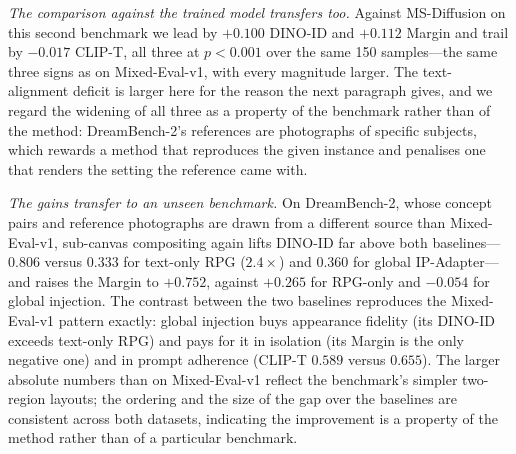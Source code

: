 \documentclass[review,10pt,times]{elsarticle}
\begin{document}
\begin{table}[htbp]
\centering
\caption{%
  \textbf{DreamBench-2 results} (150 two-concept samples from
  DreamBench++~\cite{peng2025dreambench}, $1024\times1024$).
  Ours is evaluated here at $\tau{=}1$, which is the weaker setting on
  every identity axis (Table~\ref{tab:tau}), so these numbers understate
  the method relative to its default $\tau{=}0.7$.%
}
\label{tab:dreambench2}
\end{table}

\noindent\textit{The comparison against the trained model transfers too.}
Against MS-Diffusion on this second benchmark we lead by $+0.100$ DINO-ID and
$+0.112$ Margin and trail by $-0.017$ CLIP-T, all three at $p{<}0.001$ over
the same 150 samples---the same three signs as on Mixed-Eval-v1, with every
magnitude larger.  The text-alignment deficit is larger here for the reason
the next paragraph gives, and we regard the widening of all three as a
property of the benchmark rather than of the method: DreamBench-2's
references are photographs of specific subjects, which rewards a method that
reproduces the given instance and penalises one that renders the setting the
reference came with.

\noindent\textit{The gains transfer to an unseen benchmark.}
On DreamBench-2, whose concept pairs and reference photographs are drawn
from a different source than Mixed-Eval-v1, sub-canvas compositing again
lifts DINO-ID far above both baselines---$0.806$ versus $0.333$ for
text-only RPG ($2.4\times$) and $0.360$ for global IP-Adapter---and
raises the Margin to $+0.752$, against $+0.265$ for RPG-only and
$-0.054$ for global injection.  The contrast between the two baselines
reproduces the Mixed-Eval-v1 pattern exactly: global injection buys
appearance fidelity (its DINO-ID exceeds text-only RPG) and pays for it
in isolation (its Margin is the only negative one) and in prompt
adherence (CLIP-T $0.589$ versus $0.655$).  The larger absolute numbers
than on Mixed-Eval-v1 reflect the benchmark's simpler two-region
layouts; the ordering and the size of the gap over the baselines are
consistent across both datasets, indicating the improvement is a
property of the method rather than of a particular benchmark.
\end{document}
